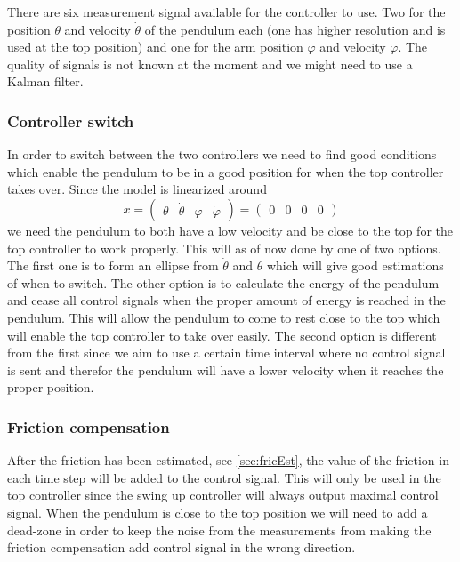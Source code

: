 \documentclass[10pt,a4paper]{article}
\begin{document}
There are six measurement signal available for the controller to use. Two for the position $ \theta $ and velocity $ \dot{\theta} $ of the pendulum each (one has higher resolution and is used at the top position) and one for the arm position $ \varphi $ and velocity $ \dot{\varphi} $. The quality of signals is not known at the moment and we might need to use a Kalman filter.

\subsubsection{Controller switch}
In order to switch between the two controllers we need to find good conditions which enable the pendulum to be in a good position for when the top controller takes over. Since the model is linearized around 
$$x =
\begin{pmatrix}
\theta & \dot\theta & \varphi & \dot\varphi
\end{pmatrix} = 
\begin{pmatrix}
0 & 0 & 0 & 0
\end{pmatrix}$$
we need the pendulum to both have a low velocity and be close to the top for the top controller to work properly.
This will as of now done by one of two options. The first one is to form an ellipse from $\dot\theta$ and $\theta$ which will give good estimations of when to switch. The other option is to calculate the energy of the pendulum and cease all control signals when the proper amount of energy is reached in the pendulum. This will allow the pendulum to come to rest close to the top which will enable the top controller to take over easily. The second option is different from the first since we aim to use a certain time interval where no control signal is sent and therefor the pendulum will have a lower velocity when it reaches the proper position.
\subsubsection{Friction compensation}
After the friction has been estimated, see \ref{sec:fricEst}, the value of the friction in each time step will be added to the control signal. This will only be used in the top controller since the swing up controller will always output maximal control signal. When the pendulum is close to the top position we will need to add a dead-zone in order to keep the noise from the measurements from making the friction compensation add control signal in the wrong direction.
\end{document}
